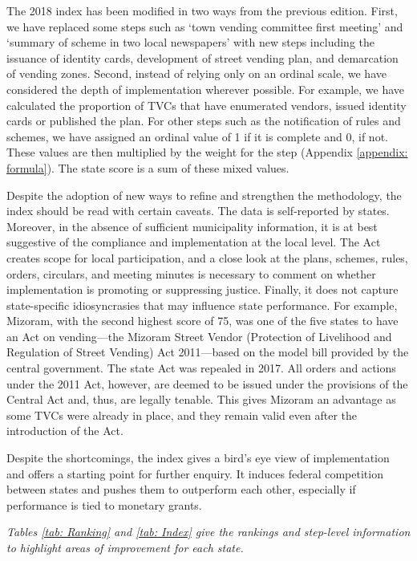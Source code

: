\documentclass[a4paper, 12pt, twoside]{article}
\begin{document}
{	The 2018 index has been modified in two ways from the previous edition. First, we have replaced some steps such as `town vending committee first meeting' and `summary of scheme in two local newspapers' with new steps including the issuance of identity cards, development of street vending plan, and demarcation of vending zones. Second, instead of relying only on an ordinal scale, we have considered the depth of implementation wherever possible. For example, we have calculated the proportion of TVCs that have enumerated vendors, issued identity cards or published the plan. For other steps such as the notification of rules and schemes, we have assigned an ordinal value of 1 if it is complete and 0, if not. These values are then multiplied by the weight for the step (Appendix \ref{appendix: formula}). The state score is a sum of these mixed values.

	Despite the adoption of new ways to refine and strengthen the methodology, the index should be read with certain caveats. The data is self-reported by states. Moreover, in the absence of sufficient municipality information, it is at best suggestive of the compliance and implementation at the local level. The Act creates scope for local participation, and a close look at the plans, schemes, rules, orders, circulars, and meeting minutes is necessary to comment on whether implementation is promoting or suppressing justice. Finally, it does not capture state-specific idiosyncrasies that may influence state performance. For example, Mizoram, with the second highest score of 75, was one of the five states to have an Act on vending—the Mizoram Street Vendor (Protection of Livelihood and Regulation of Street Vending) Act 2011—based on the model bill provided by the central government. The state Act was repealed in 2017. All orders and actions under the 2011 Act, however, are deemed to be issued under the provisions of the Central Act and, thus, are legally tenable. This gives Mizoram an advantage as some TVCs were already in place, and they remain valid even after the introduction of the Act.

	Despite the shortcomings, the index gives a bird’s eye view of implementation and offers a starting point for further enquiry. It induces federal competition between states and pushes them to outperform each other, especially if performance is tied to monetary grants.

	\textit{Tables \ref{tab: Ranking} and \ref{tab: Index} give the rankings and step-level information to highlight areas of improvement for each state.}

}
\end{document}
